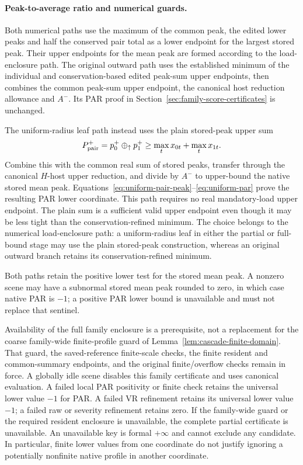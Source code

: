 \documentclass[11pt]{article}
\begin{document}
\paragraph{Peak-to-average ratio and numerical guards.}
Both numerical paths use the maximum of the common peak, the edited lower peaks and half the conserved pair total as a lower endpoint for the largest stored peak. Their upper endpoints for the mean peak are formed according to the load-enclosure path. The original outward path uses the established minimum of the individual and conservation-based edited peak-sum upper endpoints, then combines the common peak-sum upper endpoint, the canonical host reduction allowance and $A^-$. Its PAR proof in Section~\ref{sec:family-score-certificates} is unchanged.

The uniform-radius leaf path instead uses the plain stored-peak upper sum
\begin{equation}
P_{\rm pair}^+=p_0^+\oplus_\uparrow p_1^+
\ge \max_tx_{0t}+\max_tx_{1t}.
\label{eq:aggregate-uniform-peak-upper}
\end{equation}
Combine this with the common real sum of stored peaks, transfer through the canonical $H$-host upper reduction, and divide by $A^-$ to upper-bound the native stored mean peak. Equations~\eqref{eq:uniform-pair-peak}--\eqref{eq:uniform-par} prove the resulting PAR lower coordinate. This path requires no real mandatory-load upper endpoint. The plain sum is a sufficient valid upper endpoint even though it may be less tight than the conservation-refined minimum. The choice belongs to the numerical load-enclosure path: a uniform-radius leaf in either the partial or full-bound stage may use the plain stored-peak construction, whereas an original outward branch retains its conservation-refined minimum.

Both paths retain the positive lower test for the stored mean peak. A nonzero scene may have a subnormal stored mean peak rounded to zero, in which case native PAR is $-1$; a positive PAR lower bound is unavailable and must not replace that sentinel.

Availability of the full family enclosure is a prerequisite, not a replacement for the coarse family-wide finite-profile guard of Lemma~\ref{lem:cascade-finite-domain}. That guard, the saved-reference finite-scale checks, the finite resident and common-summary endpoints, and the original finite/overflow checks remain in force. A globally idle scene disables this family certificate and uses canonical evaluation. A failed local PAR positivity or finite check retains the universal lower value $-1$ for PAR. A failed VR refinement retains its universal lower value $-1$; a failed raw or severity refinement retains zero. If the family-wide guard or the required resident enclosure is unavailable, the complete partial certificate is unavailable. An unavailable key is formal $+\infty$ and cannot exclude any candidate. In particular, finite lower values from one coordinate do not justify ignoring a potentially nonfinite native profile in another coordinate.
\end{document}
